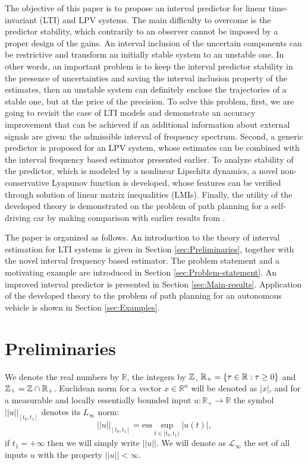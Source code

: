 \documentclass[twocolumn,english]{IEEEtran}
\theoremstyle{plain}
\theoremstyle{definition}
\theoremstyle{plain}
\theoremstyle{plain}
\theoremstyle{remark}
\begin{document}
The objective of this paper is to propose an interval predictor for linear time-invariant (LTI) and LPV systems. The main difficulty to overcome is the predictor stability, which contrarily to an observer cannot be imposed by a proper design of the gains. An interval inclusion of the uncertain components can be restrictive and transform an initially stable system to an unstable one. In other words, an important problem is to keep the interval predictor stability in the presence of uncertainties and saving the interval inclusion property of the estimates, then an unstable system can definitely enclose the trajectories of a stable one, but at the price of the precision. To solve this problem, first, we are going to revisit the case of LTI models and demonstrate an accuracy improvement that can be achieved if an additional information about external signals are given: the admissible interval of frequency spectrum. Second, a generic predictor is proposed for an LPV system, whose estimates can be combined with the interval frequency based estimator presented earlier. To analyze stability of the predictor, which is modeled by a nonlinear Lipschitz dynamics, a novel non-conservative Lyapunov function is developed, whose features can be verified through solution of linear matrix inequalities (LMIs). Finally, the utility of the developed theory is demonstrated on the problem of path planning for a self-driving car by making comparison with earlier results from
\cite{Leurent2018}.

The paper is organized as follows. An introduction to the theory of interval estimation for LTI systems is given in Section \ref{sec:Preliminaries}, together with the novel interval frequency based estimator. The problem statement and a motivating example are introduced in Section \ref{sec:Problem-statement}. An improved interval predictor is presented in Section \ref{sec:Main-results}. Application of the developed theory to the problem of path planning for an autonomous vehicle is shown in Section \ref{sec:Examples}.

\section{\label{sec:Preliminaries} Preliminaries}

We denote the real numbers  by $\mathbb{R}$, the integers by $\mathbb{Z}$, $\mathbb{R}_{+}=\{\tau\in\mathbb{R}:\tau\ge0\}$ and $\mathbb{Z}_{+}=\mathbb{Z}\cap\mathbb{R}_{+}$. Euclidean norm for a vector $x\in\mathbb{R}^{n}$ will be denoted as $|x|$, and for a measurable and locally essentially bounded input $u:\mathbb{R}_{+}\to\mathbb{R}$ the symbol $||u||_{[t_{0},t_{1}]}$ denotes its $L_{\infty}$ norm:
\[
||u||_{[t_{0},t_{1}]}=\text{ess}\sup_{t\in[t_{0},t_{1})}|u(t)|,
\]
if $t_{1}=+\infty$ then we will simply write $||u||$. We will denote as $\mathcal{L}_{\infty}$ the set of all inputs $u$ with the property $||u||<\infty$. 
\end{document}

